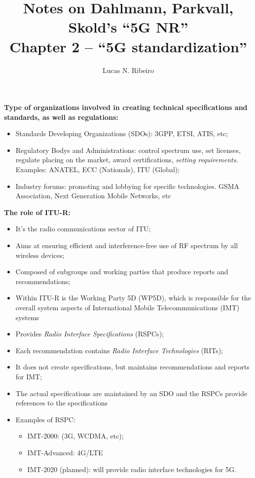 \documentclass{beamer}
\title[Chapter 7]{Notes on Dahlmann, Parkvall, Skold's ``5G NR''\\Chapter 2 --  ``5G standardization''}
\author{Lucas N. Ribeiro}
\date{}
\begin{document}
	
	\frame{\titlepage}
	
	\begin{frame}[allowframebreaks]
		\textbf{ Type of organizations involved in creating technical specifications and standards, as well as regulations:}
		\begin{itemize}
			\item Standards Developing Organizations (SDOs): 3GPP, ETSI, ATIS, etc;
			\item Regulatory Bodys and Administrations: control spectrum use, set licenses, regulate placing on the market, award certifications, \emph{setting requirements}. Examples: ANATEL, ECC (Nationals), ITU (Global);
			\item Industry forums: promoting and lobbying for specific technologies. GSMA Association, Next Generation Mobile Networks, etc
		\end{itemize}
	
		\newpage
		\textbf{The role of ITU-R:}
		\begin{itemize}
			\item It's the radio communications sector of ITU;
			\item Aims at ensuring efficient and interference-free use of RF spectrum by all wireless devices;
			\item Composed of subgroups and working parties that produce reports and recommendations;
			\item Within ITU-R is the Working Party 5D (WP5D), which is responsible for the overall system aspects of International Mobile Telecommunications (IMT) systems
			\item Provides \emph{Radio Interface Specifications} (RSPCs);
			\item Each recommendation contains \emph{Radio Interface Technologies} (RITs);
			\item It does not create specifications, but maintains recommendations and reports for IMT;
			\item The actual specifications are maintained by an SDO and the RSPCs provide references to the specifications
			\item Examples of RSPC:
			\begin{itemize}
				\item IMT-2000: (3G, WCDMA, etc);
				\item IMT-Advanced:  4G/LTE
				\item IMT-2020 (planned): will provide radio interface technologies for 5G.
			\end{itemize}
		\end{itemize}
	

\end{frame}
\end{document}
